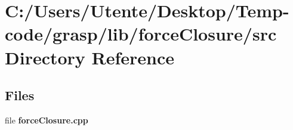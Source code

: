 \section{C\+:/\+Users/\+Utente/\+Desktop/\+Temp-\/code/grasp/lib/force\+Closure/src Directory Reference}
\label{dir_37ecab5991019130ad8c9157838771cc}
\subsection*{Files}
\begin{DoxyCompactItemize}
\item 
file {\bfseries force\+Closure.\+cpp}
\end{DoxyCompactItemize}

